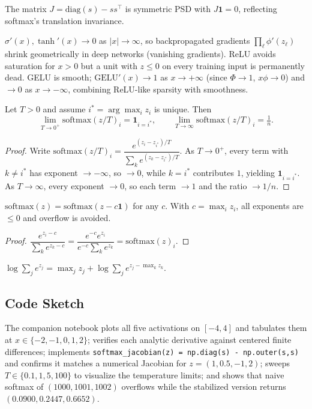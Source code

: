 The matrix $J = \mathrm{diag}(s) - ss^\top$ is symmetric PSD with $J\mathbf{1} = 0$, reflecting softmax's translation invariance.

\begin{proposition}[Saturation]
$\sigma'(x), \tanh'(x) \to 0$ as $|x|\to\infty$, so backpropagated gradients $\prod_\ell \phi'(z_\ell)$ shrink geometrically in deep networks (vanishing gradients). ReLU avoids saturation for $x>0$ but a unit with $z\le 0$ on every training input is permanently dead. GELU is smooth; $\mathrm{GELU}'(x)\to 1$ as $x\to+\infty$ (since $\Phi\to 1$, $x\phi\to 0$) and $\to 0$ as $x\to-\infty$, combining ReLU-like sparsity with smoothness.
\end{proposition}

\begin{theorem}
Let $T>0$ and assume $i^* = \arg\max_i z_i$ is unique. Then
\[
\lim_{T\to 0^+} \mathrm{softmax}(z/T)_i = \mathbf{1}_{i=i^*}, \qquad \lim_{T\to\infty}\mathrm{softmax}(z/T)_i = \tfrac{1}{n}.
\]
\end{theorem}
\begin{proof}
Write $\mathrm{softmax}(z/T)_i = \dfrac{e^{(z_i - z_{i^*})/T}}{\sum_k e^{(z_k - z_{i^*})/T}}$. As $T\to 0^+$, every term with $k\ne i^*$ has exponent $\to-\infty$, so $\to 0$, while $k=i^*$ contributes $1$, yielding $\mathbf{1}_{i=i^*}$. As $T\to\infty$, every exponent $\to 0$, so each term $\to 1$ and the ratio $\to 1/n$.
\end{proof}

\begin{proposition}
$\mathrm{softmax}(z) = \mathrm{softmax}(z - c\mathbf{1})$ for any $c$. With $c = \max_i z_i$, all exponents are $\le 0$ and overflow is avoided.
\end{proposition}
\begin{proof}
$\dfrac{e^{z_i - c}}{\sum_k e^{z_k - c}} = \dfrac{e^{-c}e^{z_i}}{e^{-c}\sum_k e^{z_k}} = \mathrm{softmax}(z)_i$.
\end{proof}

\begin{corollary}
$\log\sum_j e^{z_j} = \max_j z_j + \log\sum_j e^{z_j - \max_k z_k}$.
\end{corollary}

\subsection*{Code Sketch}

The companion notebook plots all five activations on $[-4,4]$ and tabulates them at $x\in\{-2,-1,0,1,2\}$; verifies each analytic derivative against centered finite differences; implements \texttt{softmax\_jacobian(z) = np.diag(s) - np.outer(s,s)} and confirms it matches a numerical Jacobian for $z=(1,0.5,-1,2)$; sweeps $T\in\{0.1,1,5,100\}$ to visualize the temperature limits; and shows that naive softmax of $(1000,1001,1002)$ overflows while the stabilized version returns $(0.0900,0.2447,0.6652)$.

